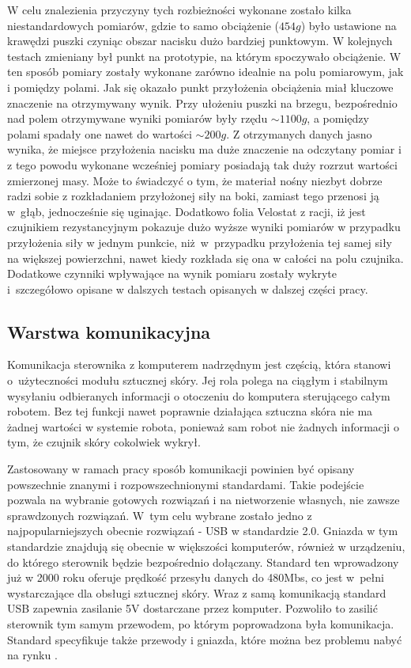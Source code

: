W celu znalezienia przyczyny tych rozbieżności wykonane zostało kilka niestandardowych pomiarów, gdzie to samo obciążenie ($454g$) było ustawione na krawędzi puszki czyniąc obszar nacisku dużo bardziej punktowym. W kolejnych testach zmieniany był punkt na prototypie, na którym spoczywało obciążenie. W ten sposób pomiary zostały wykonane zarówno idealnie na polu pomiarowym, jak i pomiędzy polami. Jak się okazało punkt przyłożenia obciążenia miał kluczowe znaczenie na otrzymywany wynik. Przy ułożeniu puszki na brzegu, bezpośrednio nad polem otrzymywane wyniki pomiarów były rzędu $\sim1100g$, a pomiędzy polami spadały one nawet do wartości $\sim200g$. Z otrzymanych danych jasno wynika, że miejsce przyłożenia nacisku ma duże znaczenie na odczytany pomiar i z tego powodu wykonane wcześniej pomiary posiadają tak duży rozrzut wartości zmierzonej masy. Może to świadczyć o tym, że materiał nośny niezbyt dobrze radzi sobie z rozkładaniem przyłożonej siły na boki, zamiast tego przenosi ją w~głąb, jednocześnie się uginając. Dodatkowo folia Velostat z racji, iż jest czujnikiem rezystancyjnym pokazuje dużo wyższe wyniki pomiarów w przypadku przyłożenia siły w jednym punkcie, niż~w~przypadku przyłożenia tej samej siły na większej powierzchni, nawet kiedy rozkłada się ona w całości na polu czujnika. Dodatkowe czynniki wpływające na wynik pomiaru zostały wykryte i~szczegółowo opisane w dalszych testach opisanych w dalszej części pracy.


\subsection{Warstwa komunikacyjna}
\label{ss_budowa_kom}

Komunikacja sterownika z komputerem nadrzędnym jest częścią, która stanowi o~użyteczności modułu sztucznej skóry. Jej rola polega na ciągłym i stabilnym wysyłaniu odbieranych informacji o otoczeniu do komputera sterującego całym robotem. Bez tej funkcji nawet poprawnie działająca sztuczna skóra nie ma żadnej wartości w systemie robota, ponieważ sam robot nie żadnych informacji o tym, że czujnik skóry cokolwiek wykrył.

Zastosowany w ramach pracy sposób komunikacji powinien być opisany powszechnie znanymi i rozpowszechnionymi standardami. Takie podejście pozwala na wybranie gotowych rozwiązań i na nietworzenie własnych, nie zawsze sprawdzonych rozwiązań. W~tym celu wybrane zostało jedno z najpopularniejszych obecnie rozwiązań - USB w standardzie 2.0. Gniazda w tym standardzie znajdują się obecnie w większości komputerów, również w urządzeniu, do którego sterownik będzie bezpośrednio dołączany. Standard ten wprowadzony już w 2000 roku oferuje prędkość przesyłu danych do 480Mbs, co jest w~pełni wystarczające dla obsługi sztucznej skóry. Wraz z samą komunikacją standard USB zapewnia zasilanie 5V dostarczane przez komputer. Pozwoliło to zasilić sterownik tym samym przewodem, po którym poprowadzona była komunikacja. Standard specyfikuje także przewody i gniazda, które można bez problemu nabyć na rynku \cite{b_manual_USB}.

